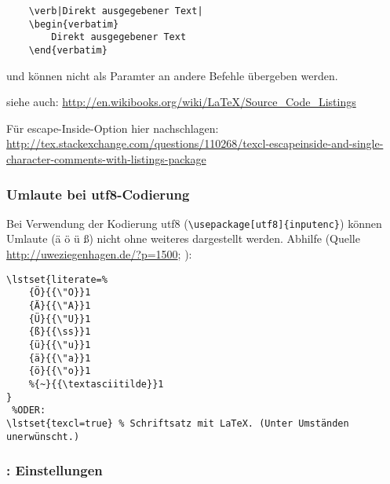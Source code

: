 \mycolumnbreak


\negAbstand
\begin{lstlisting}
	\verb|Direkt ausgegebener Text|
	\begin{verbatim}
		Direkt ausgegebener Text
	\end{verbatim}
\end{lstlisting}
 und  können nicht als Paramter an andere Befehle übergeben werden.


siehe auch: \url{http://en.wikibooks.org/wiki/LaTeX/Source_Code_Listings}

Für escape-Inside-Option hier nachschlagen: \url{http://tex.stackexchange.com/questions/110268/texcl-escapeinside-and-single-character-comments-with-listings-package}

\subsubsection*{Umlaute bei utf8-Codierung}
{\footnotesize
Bei Verwendung der Kodierung utf8 (\lstinline|\usepackage[utf8]{inputenc}|) können Umlaute (ä ö ü ß) nicht ohne weiteres  dargestellt werden. Abhilfe (Quelle \url{http://uweziegenhagen.de/?p=1500}; \qquad\qquad{}):
}
%
\begin{lstlisting}
\lstset{literate=%
    {Ö}{{\"O}}1
    {Ä}{{\"A}}1
    {Ü}{{\"U}}1
    {ß}{{\ss}}1
    {ü}{{\"u}}1
    {ä}{{\"a}}1
    {ö}{{\"o}}1
    %{~}{{\textasciitilde}}1
}
 %ODER:
\lstset{texcl=true} % Schriftsatz mit LaTeX. (Unter Umständen unerwünscht.)
\end{lstlisting}

\subsubsection{: Einstellungen}
\negAbstand
\lstset{mathescape = true}

